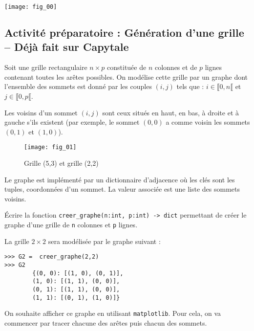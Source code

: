 \begin{marginfigure}
\texttt{[image: fig\_00]}
\end{marginfigure}

\subsection*{Activité préparatoire : Génération d'une grille -- Déjà fait sur Capytale}


Soit une grille rectangulaire $n\times p$ constituée de $n$ colonnes et de $p$ lignes contenant toutes les arêtes possibles. On modélise cette grille par un graphe dont l'ensemble des sommets est donné par les couples $(i,j)$ tels que : $i\in\llbracket 0,n \llbracket $ et $j\in\llbracket 0,p \llbracket $.

Les voisins d'un sommet $(i,j)$ sont ceux situés en haut, en bas, à droite et à gauche s'ils existent (par exemple, le sommet $(0,0)$ a comme voisin les sommets $(0,1)$ et $(1,0)$).



\begin{figure}[!h]\centering
\texttt{[image: fig\_01]}
\caption{Grille (5,3) et grille (2,2)}
\end{figure}

Le graphe est implémenté par un dictionnaire d'adjacence où les clés sont les tuples, coordonnées d'un sommet. La valeur associée est une liste des sommets voisins. 


\begin{question}
Écrire la fonction \lstinline{creer_graphe(n:int, p:int) -> dict} permettant de créer le graphe d'une grille de \lstinline{n} colonnes et \lstinline{p} lignes.
\end{question}

\begin{exemple}
La grille $ 2 \times 2$ sera modélisée par le graphe suivant :

\begin{lstlisting}
>>> G2 =  creer_graphe(2,2)
>>> G2
        {(0, 0): [(1, 0), (0, 1)],
        (1, 0): [(1, 1), (0, 0)],
        (0, 1): [(1, 1), (0, 0)],
        (1, 1): [(0, 1), (1, 0)]}
\end{lstlisting}
\end{exemple}

On souhaite afficher ce graphe en utilisant \lstinline{matplotlib}. Pour cela, on va commencer par tracer chacune des arêtes puis chacun des sommets. 

